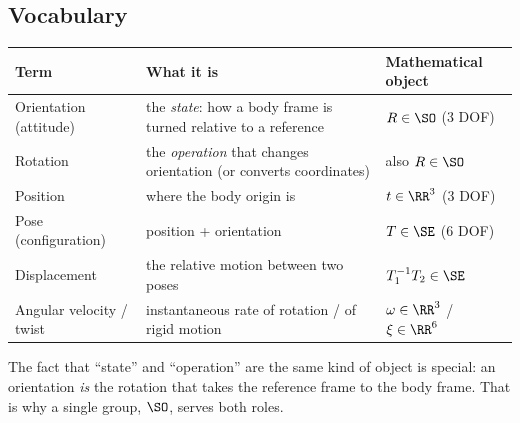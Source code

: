 \subsection{Vocabulary}\label{sec:rot:vocabulary}
\begin{center}\small
\begin{tabular}{@{}lll@{}}\toprule
Term & What it is & Mathematical object\\\midrule
Orientation (attitude) & the \emph{state}: how a body frame is turned relative to a reference & $R\in\SO$ (3 DOF)\\
Rotation & the \emph{operation} that changes orientation (or converts coordinates) & also $R\in\SO$\\
Position & where the body origin is & $t\in\RR^3$ (3 DOF)\\
Pose (configuration) & position + orientation & $T\in\SE$ (6 DOF)\\
Displacement & the relative motion between two poses & $T_1^{-1}T_2\in\SE$\\
Angular velocity / twist & instantaneous rate of rotation / of rigid motion & $\omega\in\RR^3$ / $\xi\in\RR^6$\\\bottomrule
\end{tabular}
\end{center}
The fact that ``state'' and ``operation'' are the same kind of object is special: an orientation \emph{is} the rotation that takes the reference frame to the body frame. That is why a single group, $\SO$, serves both roles.
